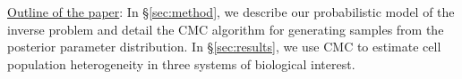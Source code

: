\underline{Outline of the paper}: In \S \ref{sec:method}, we describe our probabilistic model of the inverse problem and detail the CMC algorithm for generating samples from the posterior parameter distribution. In \S \ref{sec:results}, we use CMC to estimate cell population heterogeneity in three systems of biological interest.


